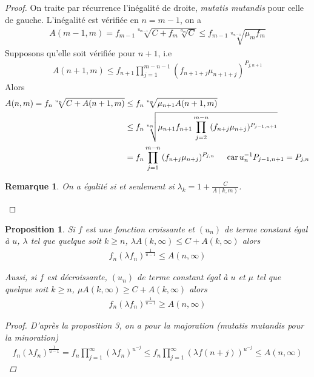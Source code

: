 \documentclass{article}
\newtheorem{prop}{Proposition}
\newtheorem*{remark}{Remarque}
\begin{document}
\begin{proof}
On traite par récurrence l'inégalité de droite, \textit{mutatis mutandis} pour celle de gauche. 
L'inégalité est vérifiée en $n=m-1$, on a 
\begin{align*}
A(m-1,m)=f_{m-1}\sqrt[u_{m-1}]{C+f_m\sqrt[u_m]{C}}\leq f_{m-1}\sqrt[u_{m-1}]{\mu_{m}f_m}
\end{align*}
Supposons qu'elle soit vérifiée pour $n+1$, i.e 
\begin{align*}
A(n+1,m)\leq f_{n+1}\prod_{j=1}^{m-n-1}{(f_{n+1+j}\mu_{n+1+j})^{P_{j,n+1}}}
\end{align*}
Alors
\begin{align*}
A(n,m) = f_n \sqrt[u_n]{C+A(n+1,m)}&\leq f_n \sqrt[u_n]{\mu_{n+1}A(n+1,m)}\\
&\leq f_n\sqrt[u_n]{\mu_{n+1}f_{n+1}\prod_{j=2}^{m-n}{(f_{n+j}\mu_{n+j})^{P_{j-1,n+1}}}}\\
&=f_n\prod_{j=1}^{m-n}{(f_{n+j}\mu_{n+j})^{P_{j,n}}}\indent \textup{car} \,
u_n^{-1}P_{j-1,n+1}=P_{j,n}
\end{align*}
\begin{remark}
On a égalité si et seulement si $\lambda_k = 1+\frac{C}{A(k,m)}$.
\end{remark}
\end{proof}
\begin{prop}
Si $f$ est une fonction croissante et $(u_n)$ de terme constant égal à $u$, $\lambda$ tel que quelque soit $k\geq n$, $\lambda A(k,\infty)\leq C+A(k,\infty)$ alors
\begin{align*}
f_n (\lambda f_n)^{\frac{1}{u-1}}\leq A(n,\infty)
\end{align*}

Aussi, si $f$ est décroissante, $(u_n)$ de terme constant égal à $u$ et $\mu$ tel que quelque soit $k\geq n$, $\mu A(k,\infty)\geq C+A(k,\infty)$ alors
\begin{align*}
f_n (\lambda f_n)^{\frac{1}{u-1}}\geq A(n,\infty)
\end{align*}
\begin{proof}
D'après la proposition 3, on  a pour la majoration (mutatis mutandis pour la minoration)
\begin{align*}
f_n (\lambda f_n)^{\frac{1}{u-1}}=f_n\prod_{j=1}^{\infty}{(\lambda f_n)^{u^{-j}}}\leq f_n\prod_{j=1}^{\infty}{(\lambda f(n+j))^{u^{-j}}}\leq A(n,\infty)
\end{align*}
\end{proof}
\end{prop}
\end{document}
